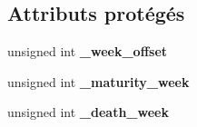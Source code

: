 \subsection*{Attributs protégés}
\begin{DoxyCompactItemize}
\item 
\mbox{\label{classRabbit_aa06aa6bf42defb922f187de5b84770b5}} 
unsigned int {\bfseries \+\_\+week\+\_\+offset}
\item 
\mbox{\label{classRabbit_a2e459e414d60ce11184b0031c77d22a3}} 
unsigned int {\bfseries \+\_\+maturity\+\_\+week}
\item 
\mbox{\label{classRabbit_ab5d6671969df82d4feb1c87778a7878d}} 
unsigned int {\bfseries \+\_\+death\+\_\+week}
\end{DoxyCompactItemize}
